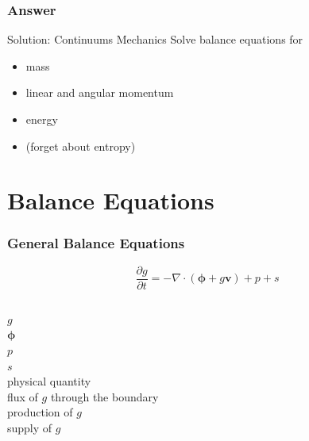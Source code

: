 \documentclass[hide notes,intlimits]{beamer}
\begin{document}
\begin{frame}
  \frametitle{Answer}

 \begin{block}{Solution: Continuums Mechanics}
   Solve balance equations for
 \begin{itemize}
    \item mass
    \item linear and angular momentum
    \item energy
    \item (forget about entropy)
    \end{itemize}
  \end{block}
\end{frame}

\section{Balance Equations}

\begin{frame}
  \frametitle{General Balance Equations}
  \begin{equation*}
   \frac{\partial g}{\partial t} = - \nabla \cdot \left(\boldsymbol{\phi} + g\mathbf{v}\right) + p + s
 \end{equation*}
 \begin{columns}
   \column[C]{0.1cm}
   $g$ \\
   $\boldsymbol{\phi}$ \\
   $p$ \\
   $s$ \\
   \column[C]{6cm}
   physical quantity \\
   flux of $g$ through the boundary \\
   production of $g$ \\
   supply of $g$
 \end{columns}
\end{frame}
\end{document}
